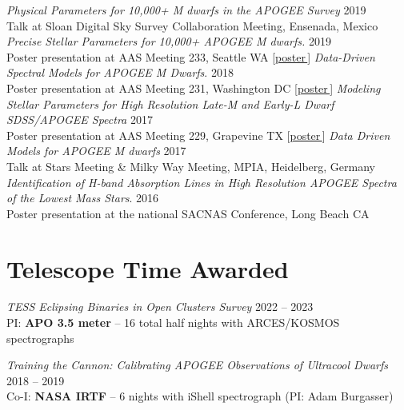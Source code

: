 \documentclass[a4,11pt]{article}
\let\orighref\href
\renewcommand{\href}[2]{\orighref{#1}{#2\,\scriptsize\faExternalLink}}
\begin{document}
\textit{Physical Parameters for 10,000+ M dwarfs in the APOGEE Survey} \hfill 2019 \\ 
Talk at Sloan Digital Sky Survey Collaboration Meeting, Ensenada, Mexico \vspace{.2cm} \newline
\textsl{Precise Stellar Parameters for 10,000+ APOGEE M dwarfs.} \hfill 2019 \\
Poster presentation at AAS Meeting 233, Seattle WA [\href{https://doi.org/10.5281/zenodo.2536586}{poster}] \vspace{.2cm} \newline 
\textit{Data-Driven Spectral Models for APOGEE M Dwarfs}. \hfill 2018 \\
Poster presentation at AAS Meeting 231, Washington DC [\href{http://doi.org/10.5281/zenodo.1146909}{poster}] \vspace{.2cm} \newline
\textsl{Modeling Stellar Parameters for High Resolution Late-M and Early-L Dwarf SDSS/APOGEE Spectra} \hfill 2017 \\
Poster presentation at AAS Meeting 229, Grapevine TX [\href{http://doi.org/10.5281/zenodo.1116625}{poster}]  \vspace{.2cm} \newline
\textit{Data Driven Models for APOGEE M dwarfs} \hfill 2017 \\ 
Talk at Stars Meeting  \& Milky Way Meeting, MPIA, Heidelberg, Germany \vspace{.2cm} \newline
\textsl{Identification of H-band Absorption Lines in High Resolution APOGEE Spectra of the Lowest Mass Stars}. \hfill 2016 \\
Poster presentation at the national SACNAS Conference, Long Beach CA 

\clearpage
\section{Telescope Time Awarded}

\textsl{TESS Eclipsing Binaries in Open Clusters Survey} \hfill 2022 -- 2023 \\
PI: \textbf{APO 3.5 meter} -- 16 total half nights with ARCES/KOSMOS spectrographs \vspace{.2cm} 

\textsl{Training the Cannon: Calibrating APOGEE Observations of Ultracool Dwarfs} \hfill 2018 -- 2019 \\ 
Co-I: \textbf{NASA IRTF} -- 6 nights with iShell spectrograph (PI: Adam Burgasser) \vspace{.2cm} 
\end{document}
